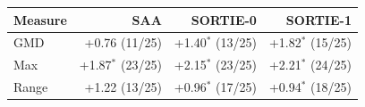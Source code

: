 \begin{tabular}{lrrr}\toprule
Measure & SAA & SORTIE-0 & SORTIE-1 \\
\midrule
GMD & +0.76 (11/25) & +1.40$^\ast$ (13/25) & +1.82$^\ast$ (15/25) \\
Max & +1.87$^\ast$ (23/25) & +2.15$^\ast$ (23/25) & +2.21$^\ast$ (24/25) \\
Range & +1.22 (13/25) & +0.96$^\ast$ (17/25) & +0.94$^\ast$ (18/25) \\
\bottomrule
\end{tabular}
